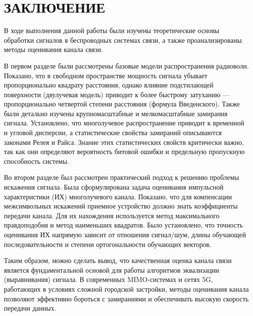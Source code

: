 \clearpage
\section*{ЗАКЛЮЧЕНИЕ}

В ходе выполнения данной работы были изучены теоретические основы обработки сигналов в беспроводных системах связи, а также проанализированы методы оценивания канала связи.

В первом разделе были рассмотрены базовые модели распространения радиоволн. Показано, что в свободном пространстве мощность сигнала убывает пропорционально квадрату расстояния, однако влияние подстилающей поверхности (двулучевая модель) приводит к более быстрому затуханию — пропорционально четвертой степени расстояния (формула Введенского). Также были детально изучены крупномасштабные и мелкомасштабные замирания сигнала. Установлено, что многолучевое распространение приводит к временной и угловой дисперсии, а статистические свойства замираний описываются законами Релея и Райса. Знание этих статистических свойств критически важно, так как они определяют вероятность битовой ошибки и предельную пропускную способность системы.

Во втором разделе был рассмотрен практический подход к решению проблемы искажения сигнала. Была сформулирована задача оценивания импульсной характеристики (ИХ) многолучевого канала. Показано, что для компенсации межсимвольных искажений приемное устройство должно знать коэффициенты передачи канала. Для их нахождения используется метод максимального правдоподобия и метод наименьших квадратов. Было установлено, что точность оценивания ИХ напрямую зависит от отношения сигнал/шум, длины обучающей последовательности и степени ортогональности обучающих векторов.

Таким образом, можно сделать вывод, что качественная оценка канала связи является фундаментальной основой для работы алгоритмов эквализации (выравнивания) сигнала. В современных MIMO-системах и сетях 5G, работающих в условиях сложной городской застройки, методы оценивания канала позволяют эффективно бороться с замираниями и обеспечивать высокую скорость передачи данных. 